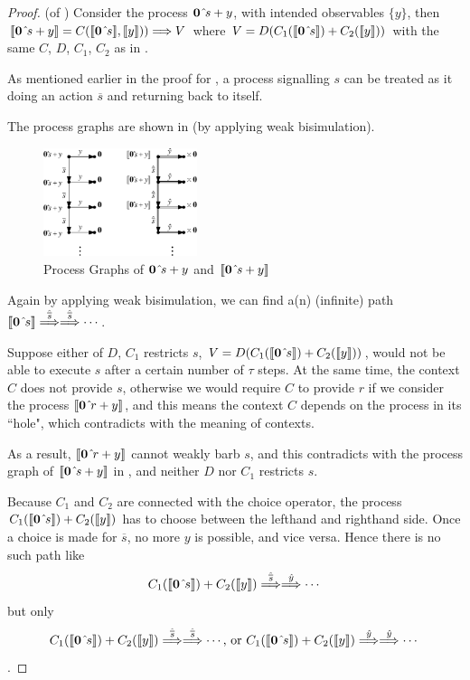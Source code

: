 \documentclass[adraft,hidelinks]{eptcs}
\begin{document}
\begin{proof} (of )
  Consider the process $\textbf{0}\mathrel{\hat{}\!}{s} + y$, with intended observables $\{y\}$, then $\bkt{\nil\signals{s} + y} = C(\bkt{\nil\signals{s}}, \bkt{y}))\vred{} V $ where $V = D(C_1(\bkt{\nil\signals{s}}) + C_2(\bkt{y}))$ with the same $C$, $D$, $C_1$, $C_2$ as in .

  As mentioned earlier in the proof for , a process signalling $s$ can be treated as it doing an action $\overline{s}$ and returning back to itself.

  The process graphs are shown in  (by applying weak bisimulation).

  \begin{figure}[ht]
    \caption{Process Graphs of $\textbf{0}\mathrel{\hat{}\!}{s} + y$ and $\bkt{\nil\signals{s} + y}$}
    \label{fig:pgsig}
    \centering
    \includegraphics[width=0.4\textwidth]{images/pgsig.eps}
  \end{figure}

  Again by applying weak bisimulation, we can find a(n) (infinite) path $\bkt{\nil\signals{s}} \hvred{\overline{s}} \hvred{\overline{s}} \cdots$.

  Suppose either of $D$, $C_1$ restricts $s$, $V=D(C_1(\bkt{\nil\signals{s}})+C_2(\bkt{y}))$, would not be able to execute $s$ after a certain number of $\tau$ steps.
  At the same time, the context $C$ does not provide $s$, otherwise we would require $C$ to provide $r$ if we consider the process $\bkt{\nil\signals{r}+y}$, and this means the context $C$ depends on the process in its ``hole", which contradicts with the meaning of contexts.

  As a result, $\bkt{\nil\signals{r}+y}$ cannot weakly barb $s$, and this contradicts with the process graph of $\bkt{\nil\signals{s} + y}$ in , and neither $D$ nor $C_1$ restricts $s$.

  Because $C_1$ and $C_2$ are connected with the choice operator, the process $C_1(\bkt{\nil\signals{s}})+C_2(\bkt y)$ has to choose between the lefthand and righthand side.
  Once a choice is made for $\overline{s}$, no more $y$ is possible, and vice versa.
  Hence there is no such path like \[C_1(\bkt{\nil\signals{s}})+C_2(\bkt y)\hvred{\overline{s}}\hvred{y}\cdots\] but only
  \[C_1(\bkt{\nil\signals{s}})+C_2(\bkt y)\hvred{\overline{s}}\hvred{\overline{s}}\cdots \text{, or }
  C_1(\bkt{\nil\signals{s}})+C_2(\bkt y)\hvred{y}\hvred{y}\cdots\].


\end{proof}
\end{document}
